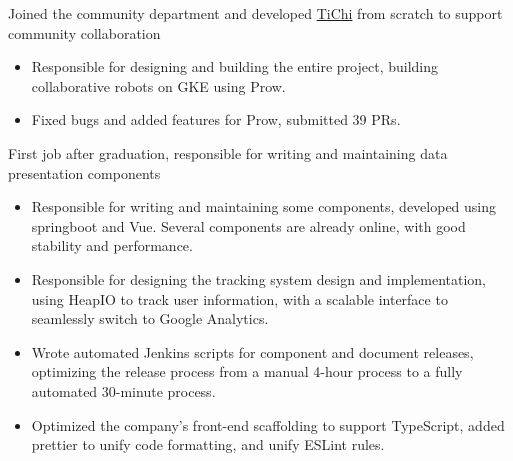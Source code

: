 \documentclass{resume}
\newcommand{\en}[1]{#1}
\newcommand{\zh}[1]{}
\begin{document}
\en{}
\zh{\datedsubsection{\textbf{\href{https://pingcap.com/zh/}{北京平凯星辰科技发展有限公司（PingCAP Inc.）- 数据库 - 前后端开发工程师}}}{2020/08 -- 2021/07}}
\en{Joined the community department and developed {\href{https://github.com/ti-community-infra/tichi}{TiChi}} from scratch to support community collaboration}
\zh{加入了社区部门，从零开发{\href{https://github.com/ti-community-infra/tichi}{TiChi}} 来支撑社区协作}
\begin{itemize}
      \item \en{Responsible for designing and building the entire project, building collaborative robots on GKE using Prow.}
            \zh{负责设计和构建整个项目，使用 Prow 在 GKE 上搭建协作机器人。}
      \item \en{Fixed bugs and added features for Prow, submitted 39 PRs.}
            \zh{为 Prow 修复 bug 和添加功能，提交了 39 个 PR。}
\end{itemize}

\en{}
\zh{\datedsubsection{\textbf{\href{https://www.morningstar.com/}{晨星资讯（Morningstar, Inc.）- 金融服务 - 前后端开发工程师}}}{2019/06 -- 2020/07}}
\en{First job after graduation, responsible for writing and maintaining data presentation components}
\zh{毕业后第一份工作，负责数据展示组件的编写和维护}
\begin{itemize}
      \item \en{Responsible for writing and maintaining some components, developed using springboot and Vue. Several components are already online, with good stability and performance.}
            \zh{负责独立组件的编写和维护，使用 springboot 和 Vue 开发。多个组件已经上线使用，有较好的稳定性和性能。}
      \item \en{Responsible for designing the tracking system design and implementation, using HeapIO to track user information, with a scalable interface to seamlessly switch to Google Analytics.}
            \zh{负责设计和实现前端 tracking 系统，使用 HeapIO 追踪用户信息，并预留可扩展接口，可无缝切换至 Google Analytics。}
      \item \en{Wrote automated Jenkins scripts for component and document releases, optimizing the release process from a manual 4-hour process to a fully automated 30-minute process.}
            \zh{为组件和文档发布编写了自动化 Jenkins 脚本，将发布流程从手动 4 小时优化到全自动 30 分钟。}
      \item \en{Optimized the company's front-end scaffolding to support TypeScript, added prettier to unify code formatting, and unify ESLint rules.}
            \zh{优化公司前端脚手架，使其支持 TypeScript，添加 prettier 统一代码格式，优化统一 ESLint 规则。}
\end{itemize}
\end{document}
